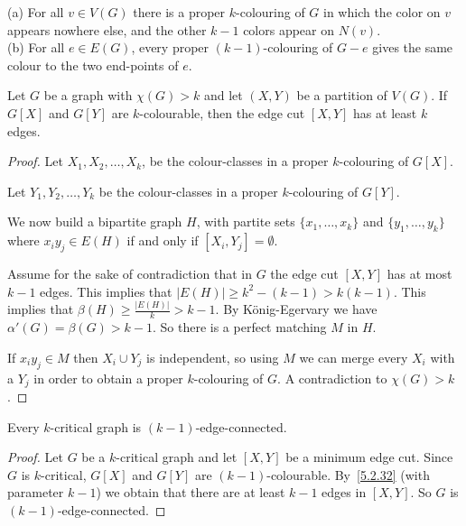 \begin{proposition}
	(a) For all $v \in V(G)$ there is a proper $k$-colouring of $G$ in which the color on $v$ appears nowhere else, and the other $k-1$ colors appear on $N(v)$.\\
	\noindent
	(b)  For all $e \in E(G)$, every proper $(k-1)$-colouring of $G-e$ gives the same colour to the two end-points of $e$.
\end{proposition}

\begin{lemma}
	\label{5.2.32}
	Let $G$ be a graph with \(\chi(G) > k\) and let $(X,Y)$ be a partition of $V(G)$. If $G[X]$ and $G[Y]$ are $k$-colourable, then the edge cut $[X,Y]$ has at least $k$ edges.
\end{lemma}

\begin{proof}
	Let $X_{1}, X_{2}, \ldots, X_{k}$, be the colour-classes in a proper $k$-colouring of $G[X]$.

	Let $Y_{1}, Y_{2}, \ldots, Y_{k}$ be the colour-classes in a proper $k$-colouring of $G[Y]$.

	We now build a bipartite graph $H$, with partite sets $\{x_{1}, \ldots, x_{k}\}$ and $\{y_{1}, \ldots, y_{k}\}$ where $x_{i}y_{j} \in E(H)$ if and only if $[X_{i}, Y_{j}] = \emptyset$.

	Assume for the sake of contradiction that in $G$ the edge cut $[X,Y]$ has at most $k-1$ edges. This implies that $|E(H)| \ge k^{2}-(k-1) > k(k-1)$. This implies that \(\beta(H) \ge \frac{|E(H)|}{k} > k-1\). By König-Egervary we have $\alpha'(G) =  \beta(G)> k-1$. So there is a perfect matching $M$ in $H$.

	If $x_{i}y_{j} \in M$ then $X_{i} \cup Y_{j}$ is independent, so using $M$ we can merge every $X_{i}$ with a $Y_{j}$ in order to obtain a proper $k$-colouring of $G$. A contradiction to \(\chi(G) > k\).
\end{proof}

\begin{theorem}[Dirac, 1953]
	Every $k$-critical graph is $(k-1)$-edge-connected.
\end{theorem}

\begin{proof}
	Let $G$ be a $k$-critical graph and let $[X,Y]$ be a minimum edge cut.  Since $G$ is $k$-critical, $G[X]$ and $G[Y]$ are $(k-1)$-colourable. By~\autoref{5.2.32} (with parameter $k-1$) we obtain that there are at least $k-1$ edges in $[X,Y]$. So $G$ is $(k-1)$-edge-connected.
\end{proof}

